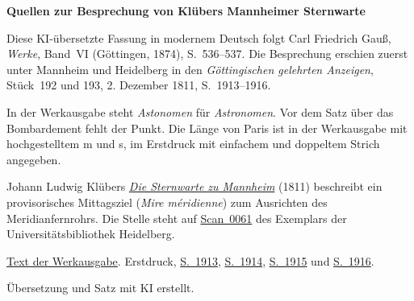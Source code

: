 \clearpage\thispagestyle{empty}
\begin{center}\textbf{Quellen zur Besprechung von Klübers Mannheimer Sternwarte}\end{center}
\noindent Diese KI-übersetzte Fassung in modernem Deutsch folgt Carl Friedrich Gauß, \textit{Werke}, Band~VI (Göttingen, 1874), S.~536--537. Die Besprechung erschien zuerst unter Mannheim und Heidelberg in den \textit{Göttingischen gelehrten Anzeigen}, Stück~192 und 193, 2. Dezember 1811, S.~1913--1916.
\par\smallskip\noindent In der Werkausgabe steht \textit{Astonomen} für \textit{Astronomen}. Vor dem Satz über das Bombardement fehlt der Punkt. Die Länge von Paris ist in der Werkausgabe mit hochgestelltem m und s, im Erstdruck mit einfachem und doppeltem Strich angegeben.
\par\smallskip\noindent Johann Ludwig Klübers \href{https://doi.org/10.11588/diglit.19120}{\textit{Die Sternwarte zu Mannheim}} (1811) beschreibt ein provisorisches Mittagsziel (\textit{Mire méridienne}) zum Ausrichten des Meridianfernrohrs. Die Stelle steht auf \href{https://doi.org/10.11588/diglit.19120#0061}{Scan~0061} des Exemplars der Universitätsbibliothek Heidelberg.
\par\smallskip\noindent \href{https://gdz.sub.uni-goettingen.de/id/PPN236007467}{Text der Werkausgabe}. Erstdruck, \href{https://images.p.sub.uni-goettingen.de/iiif/image/gdz:PPN319721507_1811:00001947/full/1650,/0/default.jpg}{S.~1913}, \href{https://images.p.sub.uni-goettingen.de/iiif/image/gdz:PPN319721507_1811:00001948/full/1650,/0/default.jpg}{S.~1914}, \href{https://images.p.sub.uni-goettingen.de/iiif/image/gdz:PPN319721507_1811:00001949/full/1650,/0/default.jpg}{S.~1915} und \href{https://images.p.sub.uni-goettingen.de/iiif/image/gdz:PPN319721507_1811:00001950/full/1650,/0/default.jpg}{S.~1916}.
\par\smallskip\noindent Übersetzung und Satz mit KI erstellt.
\clearpage
